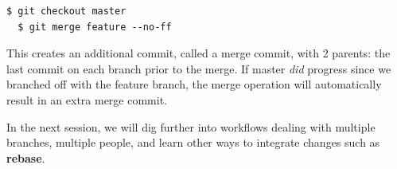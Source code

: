 \documentclass{../common/tufte-latex/tufte-handout}
\begin{document}
\begin{lstlisting}[style=BashInputStyle]
  $ git checkout master
  $ git merge feature --no-ff
\end{lstlisting}

This creates an additional commit, called a merge commit, with 2 parents: the last commit on each branch prior to the merge.
If master \textit{did} progress since we branched off with the feature branch, the merge operation will automatically result in an extra merge commit.

In the next session, we will dig further into workflows dealing with multiple branches, multiple people, and learn other ways to integrate changes such as \textbf{rebase}.



\end{document}
